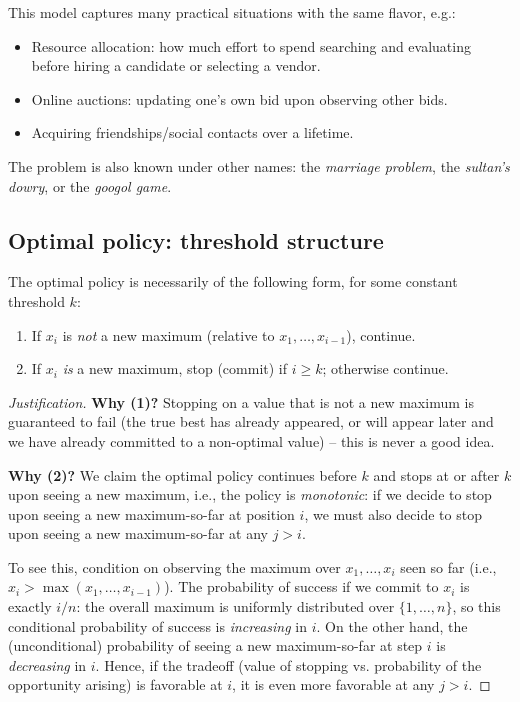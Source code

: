 This model captures many practical situations with the same flavor, e.g.:
\begin{itemize}
    \item Resource allocation: how much effort to spend searching and evaluating before hiring a candidate or selecting a vendor.
    \item Online auctions: updating one's own bid upon observing other bids.
    \item Acquiring friendships/social contacts over a lifetime.
\end{itemize}
The problem is also known under other names: the \emph{marriage problem}, the \emph{sultan's dowry}, or the \emph{googol game}.

\subsection{Optimal policy: threshold structure}

\begin{theorem}
The optimal policy is necessarily of the following form, for some constant threshold $k$:
\begin{enumerate}
    \item[(1)] If $x_i$ is \emph{not} a new maximum (relative to $x_1, \dots, x_{i-1}$), continue.
    \item[(2)] If $x_i$ \emph{is} a new maximum, stop (commit) if $i \geq k$; otherwise continue.
\end{enumerate}
\end{theorem}

\begin{proof}[Justification]
\textbf{Why (1)?} Stopping on a value that is not a new maximum is guaranteed to fail (the true best has already appeared, or will appear later and we have already committed to a non-optimal value) -- this is never a good idea.

\textbf{Why (2)?} We claim the optimal policy continues before $k$ and stops at or after $k$ upon seeing a new maximum, i.e., the policy is \emph{monotonic}: if we decide to stop upon seeing a new maximum-so-far at position $i$, we must also decide to stop upon seeing a new maximum-so-far at any $j > i$.

To see this, condition on observing the maximum over $x_1, \dots, x_i$ seen so far (i.e., $x_i > \max(x_1, \dots, x_{i-1})$). The probability of success if we commit to $x_i$ is exactly $i/n$: the overall maximum is uniformly distributed over $\{1, \dots, n\}$, so this conditional probability of success is \emph{increasing} in $i$. On the other hand, the (unconditional) probability of seeing a new maximum-so-far at step $i$ is \emph{decreasing} in $i$. Hence, if the tradeoff (value of stopping vs. probability of the opportunity arising) is favorable at $i$, it is even more favorable at any $j > i$.
\end{proof}

